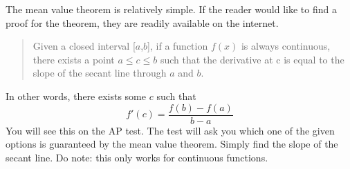 \documentclass[../revisedmain.tex]{subfiles}
\begin{document}
	The mean value theorem is relatively simple. If the reader would like to find a proof for the theorem, they are readily available on the internet.
	\begin{quotation}
		Given a closed interval [$a$,$b$], if a function $f(x)$ is always continuous, there exists a point $a\leq c\leq b$ such that the derivative at c is equal to the slope of the secant line through $a$ and $b$.
	\end{quotation}
	In other words, there exists some $c$ such that $$f'(c)=\frac{f(b)-f(a)}{b-a}$$You will see this on the AP test. The test will ask you which one of the given options is guaranteed by the mean value theorem. Simply find the slope of the secant line. Do note: this only works for continuous functions.
\end{document}
